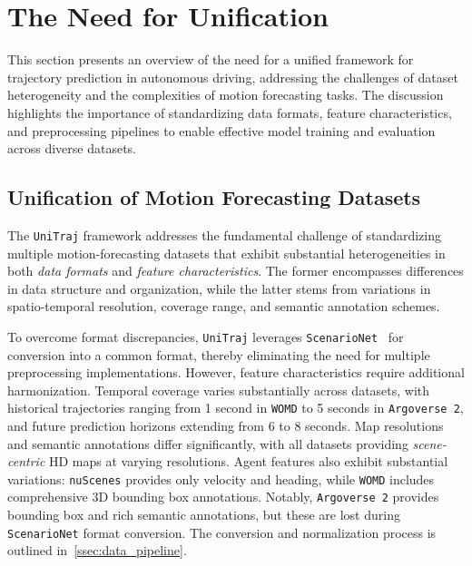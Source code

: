 \section{The Need for Unification}
\label{ch:data_methodology}

This section presents an overview of the need for a unified framework for trajectory prediction in autonomous driving, addressing the challenges of dataset heterogeneity and the complexities of motion forecasting tasks. The discussion highlights the importance of standardizing data formats, feature characteristics, and preprocessing pipelines to enable effective model training and evaluation across diverse datasets.

\subsection{Unification of Motion Forecasting Datasets}
\label{sec:data_datasets}

The \texttt{UniTraj} framework addresses the fundamental challenge of standardizing multiple motion-forecasting datasets that exhibit substantial heterogeneities in both \emph{data formats} and \emph{feature characteristics}.
The former encompasses differences in data structure and organization, while the latter stems from variations in
spatio-temporal resolution, coverage range, and semantic annotation schemes.

To overcome format discrepancies, \texttt{UniTraj} leverages \texttt{ScenarioNet}~\cite{scenarionetLi2023} for conversion into a common
format, thereby eliminating the need for multiple preprocessing implementations. However, feature characteristics require additional harmonization. Temporal coverage varies substantially
across datasets, with historical trajectories ranging from 1 second in \texttt{WOMD}\cite{wmodSun2020} to 5 seconds in \texttt{Argoverse 2}\cite{av2Wilson2023},
and future prediction horizons extending from 6 to 8 seconds. Map resolutions and semantic annotations differ
significantly, with all datasets providing \emph{scene-centric} HD maps at varying resolutions.
Agent features also exhibit substantial variations: \texttt{nuScenes} provides only velocity and heading, while
\texttt{WOMD} includes comprehensive 3D bounding box annotations. Notably, \texttt{Argoverse 2} provides bounding
box and rich semantic annotations, but these are lost during \texttt{ScenarioNet} format conversion.
The conversion and normalization process is outlined in~\autoref{ssec:data_pipeline}.

